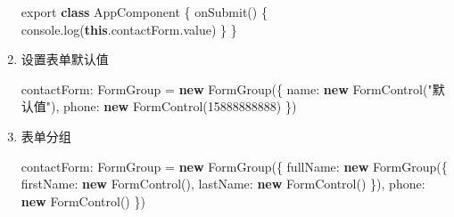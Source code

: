 \documentclass[
]{article}
\newenvironment{Shaded}{}{}
\newcommand{\AttributeTok}[1]{\textcolor[rgb]{0.49,0.56,0.16}{#1}}
\newcommand{\BuiltInTok}[1]{#1}
\newcommand{\DataTypeTok}[1]{\textcolor[rgb]{0.56,0.13,0.00}{#1}}
\newcommand{\DecValTok}[1]{\textcolor[rgb]{0.25,0.63,0.44}{#1}}
\newcommand{\FunctionTok}[1]{\textcolor[rgb]{0.02,0.16,0.49}{#1}}
\newcommand{\ImportTok}[1]{#1}
\newcommand{\KeywordTok}[1]{\textcolor[rgb]{0.00,0.44,0.13}{\textbf{#1}}}
\newcommand{\NormalTok}[1]{#1}
\newcommand{\OperatorTok}[1]{\textcolor[rgb]{0.40,0.40,0.40}{#1}}
\newcommand{\StringTok}[1]{\textcolor[rgb]{0.25,0.44,0.63}{#1}}
\begin{document}
\begin{enumerate}
\begin{Shaded}
\begin{Highlighting}[]
\ImportTok{export} \KeywordTok{class}\NormalTok{ AppComponent \{}
  \FunctionTok{onSubmit}\NormalTok{() \{}
    \BuiltInTok{console}\OperatorTok{.}\FunctionTok{log}\NormalTok{(}\KeywordTok{this}\OperatorTok{.}\AttributeTok{contactForm}\OperatorTok{.}\AttributeTok{value}\NormalTok{)}
\NormalTok{  \}}
\NormalTok{\}}
\end{Highlighting}
\end{Shaded}
\item
  设置表单默认值

\begin{Shaded}
\begin{Highlighting}[]
\NormalTok{contactForm}\OperatorTok{:}\NormalTok{ FormGroup }\OperatorTok{=} \KeywordTok{new} \FunctionTok{FormGroup}\NormalTok{(\{}
  \DataTypeTok{name}\OperatorTok{:} \KeywordTok{new} \FunctionTok{FormControl}\NormalTok{(}\StringTok{"默认值"}\NormalTok{)}\OperatorTok{,}
  \DataTypeTok{phone}\OperatorTok{:} \KeywordTok{new} \FunctionTok{FormControl}\NormalTok{(}\DecValTok{15888888888}\NormalTok{)}
\NormalTok{\})}
\end{Highlighting}
\end{Shaded}
\item
  表单分组

\begin{Shaded}
\begin{Highlighting}[]
\NormalTok{contactForm}\OperatorTok{:}\NormalTok{ FormGroup }\OperatorTok{=} \KeywordTok{new} \FunctionTok{FormGroup}\NormalTok{(\{}
  \DataTypeTok{fullName}\OperatorTok{:} \KeywordTok{new} \FunctionTok{FormGroup}\NormalTok{(\{}
    \DataTypeTok{firstName}\OperatorTok{:} \KeywordTok{new} \FunctionTok{FormControl}\NormalTok{()}\OperatorTok{,}
    \DataTypeTok{lastName}\OperatorTok{:} \KeywordTok{new} \FunctionTok{FormControl}\NormalTok{()}
\NormalTok{  \})}\OperatorTok{,}
  \DataTypeTok{phone}\OperatorTok{:} \KeywordTok{new} \FunctionTok{FormControl}\NormalTok{()}
\NormalTok{\})}
\end{Highlighting}
\end{Shaded}


\end{enumerate}
\end{document}
